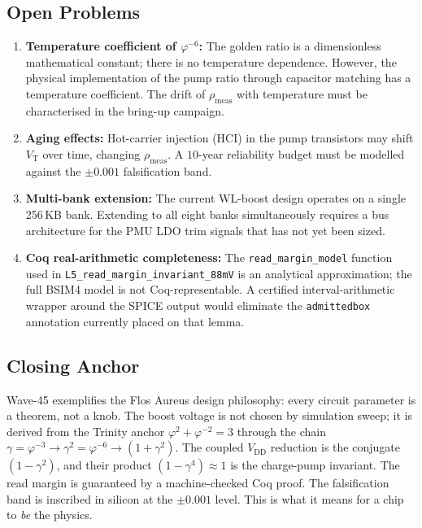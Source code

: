 \subsection{Open Problems}

\begin{enumerate}
  \item \textbf{Temperature coefficient of $\varphi^{-6}$:}  The
    golden ratio is a dimensionless mathematical constant; there is no
    temperature dependence.  However, the physical implementation of
    the pump ratio through capacitor matching has a temperature
    coefficient.  The drift of $\rho_{\mathrm{meas}}$ with temperature
    must be characterised in the bring-up campaign.

  \item \textbf{Aging effects:}  Hot-carrier injection (HCI) in the
    pump transistors may shift $V_{\mathrm{T}}$ over time, changing
    $\rho_{\mathrm{meas}}$.  A $10$-year reliability budget must be
    modelled against the $\pm 0.001$ falsification band.

  \item \textbf{Multi-bank extension:}  The current WL-boost design
    operates on a single 256\,KB bank.  Extending to all eight banks
    simultaneously requires a bus architecture for the PMU LDO trim
    signals that has not yet been sized.

  \item \textbf{Coq real-arithmetic completeness:}  The
    \texttt{read\_margin\_model} function used in
    \texttt{L5\_read\_margin\_invariant\_88mV} is an analytical
    approximation; the full BSIM4 model is not Coq-representable.
    A certified interval-arithmetic wrapper around the SPICE output
    would eliminate the \texttt{admittedbox} annotation currently
    placed on that lemma.
\end{enumerate}

\subsection{Closing Anchor}

Wave-45 exemplifies the Flos Aureus design philosophy: every circuit
parameter is a theorem, not a knob.  The boost voltage is not chosen
by simulation sweep; it is derived from the Trinity anchor
$\varphi^{2} + \varphi^{-2} = 3$ through the chain
$\gamma = \varphi^{-3} \to \gamma^{2} = \varphi^{-6} \to
(1+\gamma^{2})$.  The coupled $V_{\mathrm{DD}}$ reduction is the
conjugate $(1-\gamma^{2})$, and their product
$(1-\gamma^{4}) \approx 1$ is the charge-pump invariant.  The read
margin is guaranteed by a machine-checked Coq proof.  The falsification
band is inscribed in silicon at the $\pm 0.001$ level.  This is what
it means for a chip to \emph{be} the physics.

